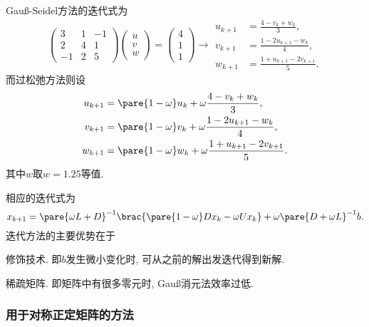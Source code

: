 \documentclass{ctexart}
\begin{document}
\begin{ex}
    Gau\ss-Seidel方法的迭代式为
    \[ \begin{pmatrix}
        3 & 1 & -1 \\ 2 & 4 & 1 \\ -1 & 2 & 5
    \end{pmatrix}\begin{pmatrix}
        u \\ v \\ w
    \end{pmatrix} = \begin{pmatrix}
        4 \\ 1 \\ 1
    \end{pmatrix} \longrightarrow \begin{aligned}
        u_{k+1} &= \frac{4-v_k+w_k}{3}, \\
        v_{k+1} &= \frac{1-2u_{k+1} - w_k}{4}, \\
        w_{k+1} &= \frac{1+u_{k+1}-2v_{k+1}}{5}.
    \end{aligned} \]
    而过松弛方法则设
    \begin{align*}
        u_{k+1} &= \pare{1-\omega}u_k + \omega\frac{4-v_k+w_k}{3}, \\
        v_{k+1} &= \pare{1-\omega}v_k + \omega\frac{1-2u_{k+1} - w_k}{4}, \\
        w_{k+1} &= \pare{1-\omega}w_k + \omega\frac{1+u_{k+1}-2v_{k+1}}{5}.
    \end{align*}
    其中$w$取$w=1.25$等值.
\end{ex}
相应的迭代式为
\[ x_{k+1} = \pare{\omega L+D}^{-1}\brac{\pare{1-\omega}Dx_k-\omega Ux_k}+\omega\pare{D+\omega L}^{-1}b. \]
迭代方法的主要优势在于
\begin{cenum}
    \item 修饰技术. 即$b$发生微小变化时, 可从之前的解出发迭代得到新解.
    \item 稀疏矩阵. 即矩阵中有很多零元时, Gau\ss 消元法效率过低.
\end{cenum}


\subsubsection{用于对称正定矩阵的方法} %
\label{ssub:用于对称正定矩阵的方法}
\end{document}
